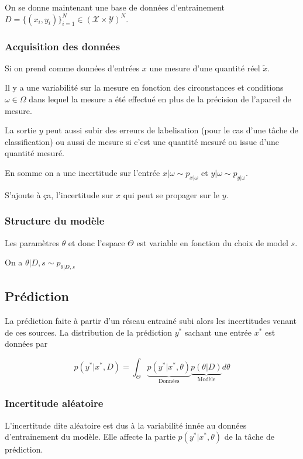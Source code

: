 \documentclass[french,12pt]{article}
\begin{document}
On se donne maintenant une base de données d'entrainement
$D = \{ (x_i, y_i)\}_{i = 1}^N \in (\mathcal{X} \times \mathcal{Y})^N$.

\subsubsection{Acquisition des données}

Si on prend comme données d'entrées $x$ une mesure d'une quantité réel $\tilde{x}$.

Il y a une variabilité sur la mesure en fonction des circonstances
et conditions $\omega \in \Omega$ dans lequel la mesure a été effectué en 
plus de la précision de l'apareil de mesure.

La sortie $y$ peut aussi subir des erreurs de labelisation
(pour le cas d'une tâche de classification) ou aussi de mesure si c'est 
une quantité mesuré ou issue d'une quantité mesuré.

En somme on a une incertitude sur l'entrée $x | \omega \sim p_{x | \omega}$
et $y | \omega \sim p_{y | \omega}$.

S'ajoute à ça, l'incertitude sur $x$ qui peut se propager sur le $y$.

\subsubsection{Structure du modèle}

Les paramètres $\theta$ et donc l'espace $\Theta$ est variable en fonction du choix de model $s$.

On a $\theta | D,s \sim p_{\theta | D, s}$

\subsection{Prédiction}

La prédiction faite à partir d'un réseau entrainé subi alors les incertitudes venant
de ces sources. La distribution de la prédiction $y^*$ sachant une entrée $x^*$ est données par

$$ p(y^* | x^*, D) = \int_{\Theta} \underbrace{p(y^* | x^*, \theta)}_{\text{Données}} \underbrace{p(\theta  | D)}_{\text{Modèle}} d \theta$$

\subsubsection{Incertitude aléatoire}

L'incertitude dite aléatoire est dus à la variabilité innée au données d'entrainement
du modèle. Elle affecte la partie $p(y^* | x^*, \theta)$ de la tâche de prédiction.
\end{document}
